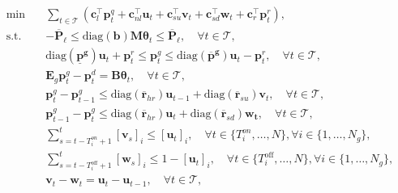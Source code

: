 \documentclass[11pt]{exam}
\begin{document}
\begin{questions}
\begin{subequations}\label{ucpoweroptproblem}
\begin{align}
\!\!\!\! \min \quad & \sum_{t\in \mathcal{T}}\left(\mathbf{c}_l^\intercal\mathbf{p}^q_{t}+\mathbf{c}_{nl}^\intercal\mathbf{u}_{t}+\mathbf{c}_{su}^\intercal\mathbf{v}_{t}+\mathbf{c}_{sd}^\intercal\mathbf{w}_{t} + \mathbf{c}_r^\intercal\mathbf{p}^r_{t}\right), \label{eq:uc-objective}\\
\!\!\!\! \text{s.t.} \quad & -\mathbf{\overline{P}}_{\ell} \leq \text{diag}(\textbf{b}) \textbf{M}\boldsymbol{\theta}_t \leq \mathbf{\overline{P}}_{\ell}, \quad \forall t\in \mathcal{T}, \label{eq:uc-flowlimits}\\
& \text{diag}(\mathbf{\underline{p}^g})\mathbf{u}_{t}+\mathbf{p}^r_{t}\leq \mathbf{p}^g_t\leq \text{diag}(\mathbf{\overline{p}^g})\mathbf{u}_{t}-\mathbf{p}^r_{t}, \quad \forall t\in \mathcal{T},  \label{eq:uc-capacitylimits}\\
& \mathbf{E}_g\mathbf{p}^g_t -  \mathbf{p}^d_t = \mathbf{B} \boldsymbol{\theta}_t, \quad \forall t\in \mathcal{T}, \label{eq:uc-powerflow}\\
& \mathbf{p}^g_{t}-\mathbf{p}^g_{t-1}\leq \text{diag}(\overline{\textbf{r}}_{hr})\mathbf{u}_{t-1}+\text{diag}(\overline{\textbf{r}}_{su})\mathbf{v}_{t}, \quad \forall t\in \mathcal{T}, \label{eq:uc-startupramping}\\
& \mathbf{p}^g_{t-1}-\mathbf{p}^g_{t}\leq \text{diag}(\overline{\textbf{r}}_{hr})\mathbf{u}_{t}+\text{diag}(\overline{\textbf{r}}_{sd})\mathbf{w_{t}}, \quad \forall t\in \mathcal{T},\label{eq:uc-stutdownramping}\\
& \sum_{s=t-T^{on}_{i}+1}^{t}\left[\mathbf{v}_{s}\right]_i\leq \left[\mathbf{u}_{t}\right]_i, \quad \forall t \in \{T^{on}_{i},\dots,N\}, \forall i \in \{1,\dots,N_g\}, \label{eq:uc-minuptime}\\
& \sum_{s=t-T^{\text{off}}_{i}+1}^{t}\left[\mathbf{w}_{s}\right]_i\leq 1-\left[\mathbf{u}_{t}\right]_i, \quad \forall t \in \{T^{\text{off}}_{i},\dots,N\}, \forall i \in \{1,\dots,N_g\},\label{eq:uc-mindowntime}\\
& \mathbf{v}_{t}-\mathbf{w}_{t}=\mathbf{u}_{t}-\mathbf{u}_{t-1}, \quad \forall t\in \mathcal{T}, \label{eq:uc-commitmentconstraints}\\

\end{align}
\end{subequations}
\end{questions}
\end{document}
